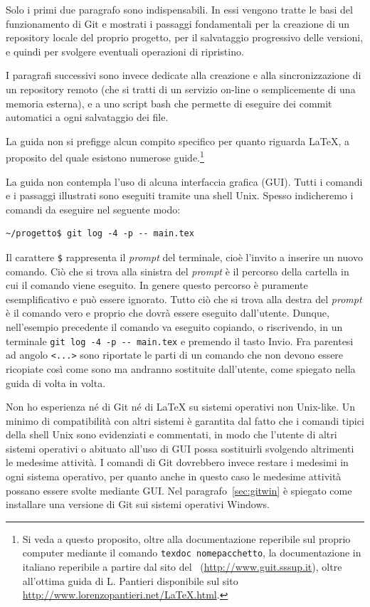 \documentclass[a4paper,12pt,oneside]{article}
\begin{document}
Solo i primi due paragrafo sono indispensabili. In essi vengono tratte le basi
del funzionamento di Git e  mostrati i passaggi fondamentali per la creazione di
un repository locale del proprio progetto, per il salvataggio progressivo delle
versioni, e quindi per svolgere eventuali operazioni di ripristino.

I paragrafi successivi sono invece dedicate alla creazione e alla
sincronizzazione di un repository remoto (che si tratti di un servizio on-line
o semplicemente di una memoria esterna), e a uno script bash che permette di
eseguire dei commit automatici a ogni salvataggio dei file.

La guida non si prefigge alcun compito specifico per quanto riguarda \LaTeX, a
proposito del quale esistono numerose guide.\footnote{Si veda a questo proposito,
  oltre alla documentazione reperibile sul proprio computer mediante il comando
  \lstinline|texdoc nomepacchetto|, la documentazione in italiano reperibile a
  partire dal sito del \guit\ (\url{http://www.guit.sssup.it}), oltre all'ottima guida
  di L. Pantieri disponibile sul sito
  \url{http://www.lorenzopantieri.net/LaTeX.html}.}

La guida non contempla l'uso di alcuna interfaccia grafica (GUI). Tutti i
comandi e i passaggi illustrati sono eseguiti tramite una shell Unix. Spesso
indicheremo i comandi da eseguire nel seguente modo:
\begin{lstlisting}
~/progetto$ git log -4 -p -- main.tex
\end{lstlisting}
Il carattere \lstinline|$| rappresenta il \emph{prompt} del terminale, cioè
l'invito a inserire un nuovo comando. Ciò che si trova alla sinistra del
\emph{prompt} è il percorso della cartella in cui il comando viene eseguito. In
genere questo percorso è puramente esemplificativo e può essere ignorato. Tutto
ciò che si trova alla destra del \emph{prompt} è il comando vero e proprio che
dovrà essere eseguito dall'utente. Dunque, nell'esempio precedente il comando va
eseguito copiando, o riscrivendo, in un terminale
\lstinline|git log -4 -p -- main.tex| e premendo il tasto Invio. Fra parentesi
ad angolo \lstinline|<...>| sono riportate le parti di un comando che non devono
essere ricopiate così come sono ma andranno sostituite dall'utente, come
spiegato nella guida di volta in volta.

Non ho esperienza né di Git né di \LaTeX{} su sistemi operativi non
Unix-like. Un minimo di compatibilità con altri sistemi è garantita dal fatto
che i comandi tipici della shell Unix sono evidenziati e commentati, in modo
che l'utente di altri sistemi operativi o abituato all'uso di GUI possa
sostituirli svolgendo altrimenti le medesime attività. I comandi di Git
dovrebbero invece restare i medesimi in ogni sistema operativo, per quanto anche
in questo caso le medesime attività possano essere svolte mediante GUI. Nel
paragrafo~\ref{sec:gitwin} è spiegato come installare una versione di Git sui
sistemi operativi Windows.
\end{document}
